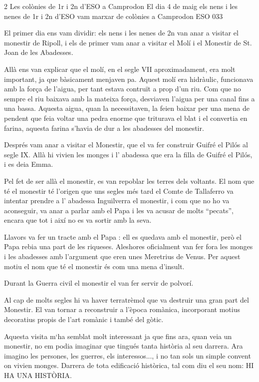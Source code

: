 \begin{news}
{2} %
{Les colònies de 1r i 2n d'ESO a Camprodon}
{El dia 4 de maig els nens i les nenes de 1r i 2n d'ESO vam marxar de colònies a Camprodon}
{ESO}
{033} %



El primer dia ens vam dividir: els nens i les nenes de 2n van anar a visitar el monestir de Ripoll, i els de primer vam anar a visitar el Molí i el Monestir de St. Joan de les Abadesses.

Allà ens van explicar que el molí, en el segle VII aproximadament, era molt important, ja que bàsicament menjaven pa. Aquest molí era hidràulic,  funcionava amb la força de l'aigua, per tant estava contruït a prop d'un riu. Com que no sempre el riu baixava amb la mateixa força, desviaven l'aigua per una canal fins a una bassa. Aquesta aigua, quan la necessitaven, la feien baixar per una mena de pendent que feia voltar una pedra enorme que triturava el blat i el convertia en farina, aquesta farina s'havia de dur a les abadesses del monestir.

Després vam anar a visitar el Monestir, que el va fer construir Guifré el Pilós al segle IX. Allà hi vivien les monges i l' abadessa que era la filla de Guifré el Pilós, i es deia Emma.  

Pel fet de ser allà el monestir, es van repoblar les  terres dels voltants.
 El nom que té el monestir té l'origen  que uns segles més tard el Comte de Tallaferro va intentar prendre a l' abadessa Inguilverra el monestir, i com que no ho va aconseguir, va anar a parlar amb el Papa i les va acusar de molts “pecats”, encara que tot i així no es  va sortir amb la seva.

Llavors va fer un tracte amb el Papa : ell es quedava amb el monestir,  però el Papa rebia una part de les riqueses. Aleshores oficialment van fer fora   les monges i  les abadesses amb l'argument que  eren unes Meretrius de Venus. Per aquest motiu el nom que té el monestir és com una mena d'insult. 

Durant la Guerra civil el monestir el van fer servir de polvorí. 

Al cap de molts segles hi va haver terratrèmol que va destruir una gran part del Monestir. 
El van tornar a reconstruir a l'època romànica, incorporant motius decoratius propis de l'art romànic i també del gòtic.

Aquesta visita m`ha semblat molt interessant ja que fins ara, quan veia un monestir, no em podia imaginar que tingués tanta història al seu darrera. Ara imagino les persones, les guerres, els interessos..., i no tan sols un simple convent on vivien monges. Darrera de tota edificació històrica, tal com diu el seu nom: HI HA UNA HISTÒRIA.



\end{news}
